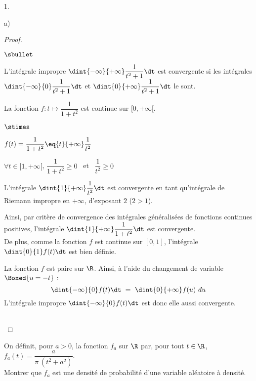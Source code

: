 \documentclass[11pt]{article}%
\begin{document}
\begin{noliste}{1.}
\begin{noliste}{a)}
    \begin{proof}~%
      \begin{noliste}{$\sbullet$}
      \item L'intégrale impropre $\dint{-\infty}{+\infty}
        \dfrac{1}{t^2+1} \dt$ est convergente si les intégrales
        $\dint{-\infty}{0} \dfrac{1}{t^2+1} \dt$ et $\dint{0}{+\infty}
        \dfrac{1}{t^2+1} \dt$ le sont.

      \item La fonction $f : t \mapsto \dfrac{1}{1 + t^2}$ est
        continue sur $[0, +\infty[$.
        \begin{noliste}{$\stimes$}
        \item $f(t) = \dfrac{1}{1 + t^2} \eq{t}{+\infty}
          \dfrac{1}{t^2}$

        \item $\forall t \in [1, +\infty[$, $\dfrac{1}{1 + t^2} \geq
          0$ \ et \ $\dfrac{1}{t^2} \geq 0$

        \item L'intégrale $\dint{1}{+\infty} \dfrac{1}{t^2} \dt$ est
          convergente en tant qu'intégrale de Riemann impropre en
          $+\infty$, d'exposant $2$ ($2 > 1$).          
        \end{noliste}
        Ainsi, par critère de convergence des intégrales généralisées
        de fonctions continues positives, l'intégrale
        $\dint{1}{+\infty} \dfrac{1}{1+t^2} \dt$ est convergente.\\
        De plus, comme la fonction $f$ est continue sur $[0, 1]$,
        l'intégrale $\dint{0}{1} f(t) \dt$ est bien définie.%

      \item La fonction $f$ est paire sur $\R$. Ainsi, à l'aide du
        changement de variable $\Boxed{u = -t}$ :
        \[
        \dint{-\infty}{0} f(t) \dt \ = \ \dint{0}{+\infty} f(u) \ du
        \]
        L'intégrale impropre $\dint{-\infty}{0} f(t) \dt$ est donc
        elle aussi convergente.
      \end{noliste}
      ~\\[-1cm]
    \end{proof}
    
    
    
    

  \item On définit, pour $a > 0$, la fonction $f_a$ sur $\R$ par, pour
    tout $t \in \R$, $f_a(t) = \dfrac{a}{\pi \ (t^2+a^2)}$.\\
    Montrer que $f_a$ est une densité de probabilité d'une variable
    aléatoire à densité.


\end{noliste}
\end{noliste}
\end{document}

